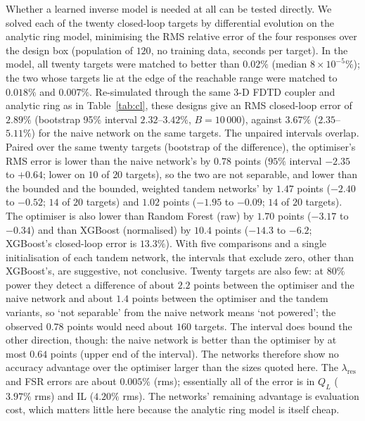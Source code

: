 \documentclass[11pt]{article}
\newcommand{\lres}{\lambda_{\mathrm{res}}}
\newcommand{\QL}{Q_L}
\begin{document}
Whether a learned inverse model is needed at all can be tested directly. We solved each of the twenty closed-loop targets by differential evolution on the analytic ring model, minimising the RMS relative error of the four responses over the design box (population of $120$, no training data, seconds per target). In the model, all twenty targets were matched to better than $0.02\%$ (median $8\times 10^{-5}\%$); the two whose targets lie at the edge of the reachable range were matched to $0.018\%$ and $0.007\%$. Re-simulated through the same 3-D FDTD coupler and analytic ring as in Table~\ref{tab:cl}, these designs give an RMS closed-loop error of $2.89\%$ (bootstrap 95\% interval $2.32$--$3.42\%$, $B = 10\,000$), against $3.67\%$ ($2.35$--$5.11\%$) for the naive network on the same targets. The unpaired intervals overlap. Paired over the same twenty targets (bootstrap of the difference), the optimiser's RMS error is lower than the naive network's by $0.78$ points ($95\%$ interval $-2.35$ to $+0.64$; lower on $10$ of $20$ targets), so the two are not separable, and lower than the bounded and the bounded, weighted tandem networks' by $1.47$ points ($-2.40$ to $-0.52$; $14$ of $20$ targets) and $1.02$ points ($-1.95$ to $-0.09$; $14$ of $20$ targets). The optimiser is also lower than Random Forest (raw) by $1.70$ points ($-3.17$ to $-0.34$) and than XGBoost (normalised) by $10.4$ points ($-14.3$ to $-6.2$; XGBoost's closed-loop error is $13.3\%$). With five comparisons and a single initialisation of each tandem network, the intervals that exclude zero, other than XGBoost's, are suggestive, not conclusive. Twenty targets are also few: at $80\%$ power they detect a difference of about $2.2$ points between the optimiser and the naive network and about $1.4$ points between the optimiser and the tandem variants, so `not separable' from the naive network means `not powered'; the observed $0.78$ points would need about $160$ targets. The interval does bound the other direction, though: the naive network is better than the optimiser by at most $0.64$ points (upper end of the interval). The networks therefore show no accuracy advantage over the optimiser larger than the sizes quoted here. The $\lres$ and FSR errors are about $0.005\%$ (rms); essentially all of the error is in $\QL$ ($3.97\%$ rms) and IL ($4.20\%$ rms). The networks' remaining advantage is evaluation cost, which matters little here because the analytic ring model is itself cheap.
\end{document}
